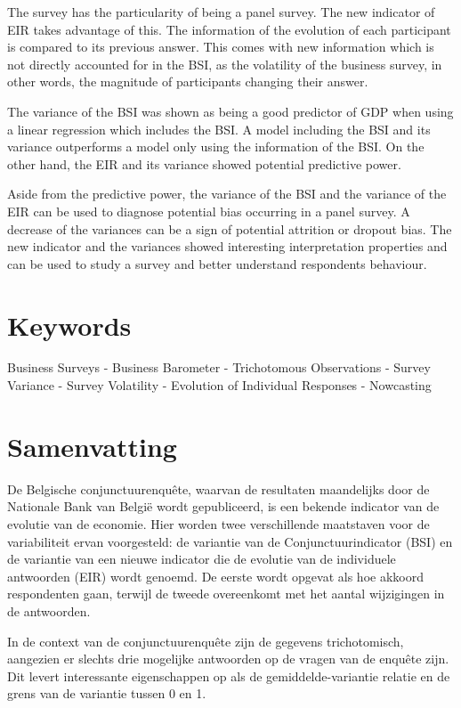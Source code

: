 \documentclass[12pt,a4paper,oneside]{book}
\begin{document}
The survey has the particularity of being a panel survey. The new indicator of EIR takes advantage of this. The information of the evolution of each participant is compared to its previous answer. This comes with new information which is not directly accounted for in the BSI, as the volatility of the business survey, in other words, the magnitude of participants changing their answer.

The variance of the BSI was shown as being a good predictor of GDP when using a linear regression which includes the BSI. A model including the BSI and its variance outperforms a model only using the information of the BSI. On the other hand, the EIR and its variance showed potential predictive power.

Aside from the predictive power, the variance of the BSI and the variance of the EIR can be used to diagnose potential bias occurring in a panel survey. A decrease of the variances can be a sign of potential attrition or dropout bias. The new indicator and the variances showed interesting interpretation properties and can be used to study a survey and better understand respondents behaviour.

\section*{Keywords}
Business Surveys - 
Business Barometer -
Trichotomous Observations -
Survey Variance - 
Survey Volatility -
Evolution of Individual Responses -
Nowcasting

\section*{Samenvatting}

De Belgische conjunctuurenquête, waarvan de resultaten maandelijks door de Nationale Bank van België wordt gepubliceerd, is een bekende indicator van de evolutie van de economie. Hier worden twee verschillende maatstaven voor de variabiliteit ervan voorgesteld: de variantie van de Conjunctuurindicator (BSI) en de variantie van een nieuwe indicator die de evolutie van de individuele antwoorden (EIR) wordt genoemd. De eerste wordt opgevat als hoe akkoord respondenten gaan, terwijl de tweede overeenkomt met het aantal wijzigingen in de antwoorden.

In de context van de conjunctuurenquête zijn de gegevens trichotomisch, aangezien er slechts drie mogelijke antwoorden op de vragen van de enquête zijn. Dit levert interessante eigenschappen op als de gemiddelde-variantie relatie en de grens van de variantie tussen 0 en 1.
\end{document}
